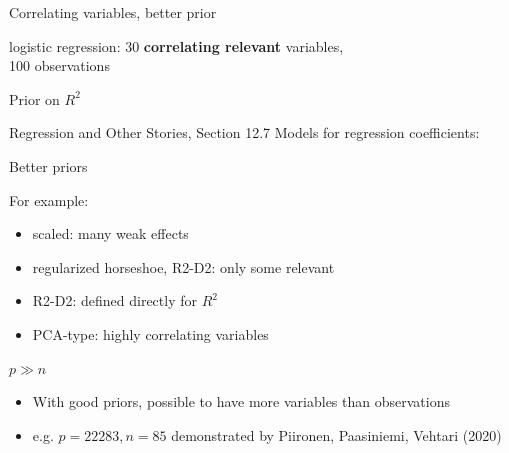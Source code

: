 \documentclass[english,t]{beamer}
\begin{document}
\begin{frame}{Correlating variables, better prior}

  logistic regression: 30 \textbf{correlating relevant} variables, \\100
  observations
  

\end{frame}

\begin{frame}{Prior on $R^2$}

  Regression and Other Stories, Section 12.7 Models for regression
  coefficients: 


  
\end{frame}

\begin{frame}{Better priors}

  For example:
  \begin{itemize}
  \item scaled: many weak effects
  \item regularized horseshoe, R2-D2: only some relevant
  \item R2-D2: defined directly for $R^2$
  \item PCA-type: highly correlating variables
  \end{itemize}

\end{frame}


\begin{frame}{$p \gg n$}

  \begin{itemize}
  \item With good priors, possible to have more variables than observations
  \item e.g. $p=22283, n=85$ demonstrated by Piironen, Paasiniemi,
    Vehtari (2020)
  \end{itemize}
\end{frame}
\end{document}
